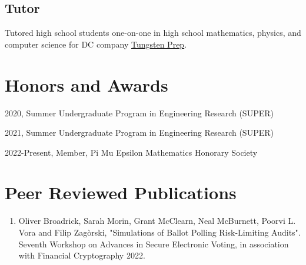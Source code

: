 \documentclass[letterpaper]{article}
\renewenvironment{itemize}{
  \begin{list}{}{
    \setlength{\leftmargin}{1.5em}
  }
}{
  \end{list}
}
\begin{document}
\subsection*{Tutor}
Tutored high school students one-on-one in high school mathematics, physics, and computer science for DC company \href{https://www.tungstenprep.com/}{Tungsten Prep}.

\section*{Honors and Awards}

\begin{itemize}
\item 2020, Summer Undergraduate Program in Engineering Research (SUPER)
\item 2021, Summer Undergraduate Program in Engineering Research (SUPER)
\item 2022-Present, Member, Pi Mu Epsilon Mathematics Honorary Society
\end{itemize}


\section*{Peer Reviewed Publications}

\begin{enumerate}

\item Oliver Broadrick, Sarah Morin, Grant McClearn, Neal McBurnett, Poorvi L. Vora and Filip Zag\`{o}rski, "Simulations of Ballot Polling Risk-Limiting Audits". Seventh Workshop on Advances in Secure Electronic Voting, in association with Financial Cryptography 2022.

\end{enumerate}

\bigskip
\end{document}
